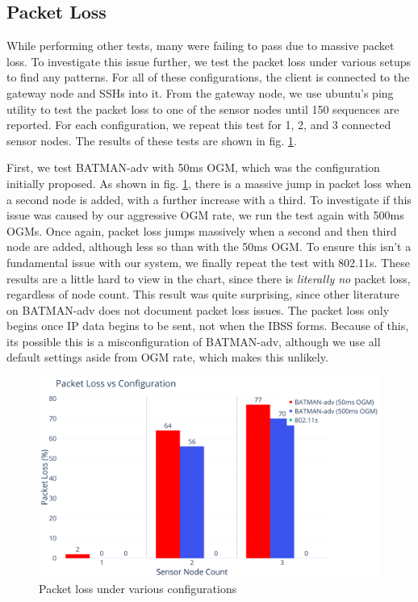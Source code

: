 \documentclass[journal]{IEEEtran}
\begin{document}
\subsection{Packet Loss}
While performing other tests, many were failing to pass due to massive packet loss. To investigate this issue further, we test the packet loss under various setups to find any patterns. For all of these configurations, the client is connected to the gateway node and SSHs into it. From the gateway node, we use ubuntu's ping utility to test the packet loss to one of the sensor nodes until 150 sequences are reported. For each configuration, we repeat this test for 1, 2, and 3 connected sensor nodes. The results of these tests are shown in fig. \ref{fig:packetloss}.

First, we test BATMAN-adv with 50ms OGM, which was the configuration initially proposed. As shown in fig. \ref{fig:packetloss}, there is a massive jump in packet loss when a second node is added, with a further increase with a third. To investigate if this issue was caused by our aggressive OGM rate, we run the test again with 500ms OGMs. Once again, packet loss jumps massively when a second and then third node are added, although less so than with the 50ms OGM. To ensure this isn't a fundamental issue with our system, we finally repeat the test with 802.11s. These results are a little hard to view in the chart, since there is \textit{literally no} packet loss, regardless of node count. This result was quite surprising, since other literature on BATMAN-adv does not document packet loss issues. The packet loss only begins once IP data begins to be sent, not when the IBSS forms. Because of this, its possible this is a misconfiguration of BATMAN-adv, although we use all default settings aside from OGM rate, which makes this unlikely.

\begin{figure}[t]
    \centering
    \includegraphics[width=\linewidth]{images/Packet Loss vs Configuration.png}
    \caption{Packet loss under various configurations}
    \label{fig:packetloss}
\end{figure}
\end{document}
